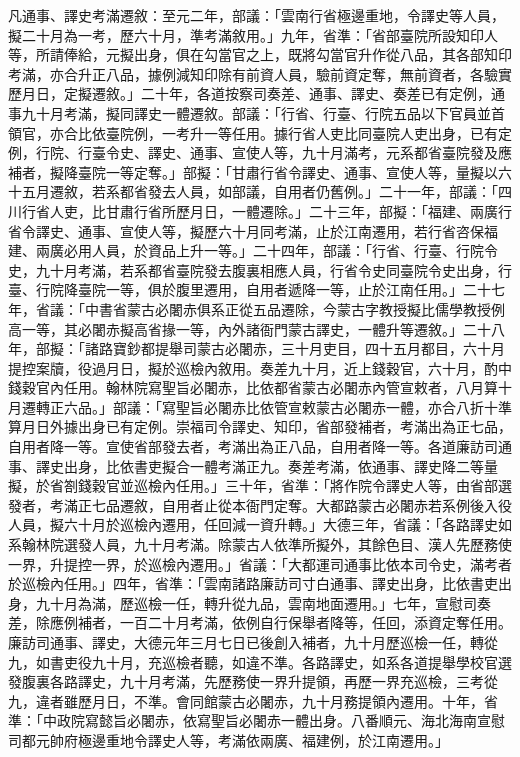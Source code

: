 \begin{pinyinscope}
 凡通事、譯史考滿遷敘：至元二年，部議：「雲南行省極邊重地，令譯史等人員，擬二十月為一考，歷六十月，準考滿敘用。」九年，省準：「省部臺院所設知印人等，所請俸給，元擬出身，俱在勾當官之上，既將勾當官升作從八品，其各部知印考滿，亦合升正八品，據例減知印除有前資人員，驗前資定奪，無前資者，各驗實歷月日，定擬遷敘。」二十年，各道按察司奏差、通事、譯史、奏差已有定例，通事九十月考滿，擬同譯史一體遷敘。部議：「行省、行臺、行院五品以下官員並首領官，亦合比依臺院例，一考升一等任用。據行省人吏比同臺院人吏出身，已有定例，行院、行臺令史、譯史、通事、宣使人等，九十月滿考，元系都省臺院發及應補者，擬降臺院一等定奪。」部擬：「甘肅行省令譯史、通事、宣使人等，量擬以六十五月遷敘，若系都省發去人員，如部議，自用者仍舊例。」二十一年，部議：「四川行省人吏，比甘肅行省所歷月日，一體遷除。」二十三年，部擬：「福建、兩廣行省令譯史、通事、宣使人等，擬歷六十月同考滿，止於江南遷用，若行省咨保福建、兩廣必用人員，於資品上升一等。」二十四年，部議：「行省、行臺、行院令史，九十月考滿，若系都省臺院發去腹裏相應人員，行省令史同臺院令史出身，行臺、行院降臺院一等，俱於腹里遷用，自用者遞降一等，止於江南任用。」二十七年，省議：「中書省蒙古必闍赤俱系正從五品遷除，今蒙古字教授擬比儒學教授例高一等，其必闍赤擬高省掾一等，內外諸衙門蒙古譯史，一體升等遷敘。」二十八年，部擬：「諸路寶鈔都提舉司蒙古必闍赤，三十月吏目，四十五月都目，六十月提控案牘，役過月日，擬於巡檢內敘用。奏差九十月，近上錢穀官，六十月，酌中錢穀官內任用。翰林院寫聖旨必闍赤，比依都省蒙古必闍赤內管宣敕者，八月算十月遷轉正六品。」部議：「寫聖旨必闍赤比依管宣敕蒙古必闍赤一體，亦合八折十準算月日外據出身已有定例。崇福司令譯史、知印，省部發補者，考滿出為正七品，自用者降一等。宣使省部發去者，考滿出為正八品，自用者降一等。各道廉訪司通事、譯史出身，比依書吏擬合一體考滿正九。奏差考滿，依通事、譯史降二等量擬，於省劄錢穀官並巡檢內任用。」三十年，省準：「將作院令譯史人等，由省部選發者，考滿正七品遷敘，自用者止從本衙門定奪。大都路蒙古必闍赤若系例後入役人員，擬六十月於巡檢內遷用，任回減一資升轉。」大德三年，省議：「各路譯史如系翰林院選發人員，九十月考滿。除蒙古人依準所擬外，其餘色目、漢人先歷務使一界，升提控一界，於巡檢內遷用。」省議：「大都運司通事比依本司令史，滿考者於巡檢內任用。」四年，省準：「雲南諸路廉訪司寸白通事、譯史出身，比依書吏出身，九十月為滿，歷巡檢一任，轉升從九品，雲南地面遷用。」七年，宣慰司奏差，除應例補者，一百二十月考滿，依例自行保舉者降等，任回，添資定奪任用。廉訪司通事、譯史，大德元年三月七日已後創入補者，九十月歷巡檢一任，轉從九，如書吏役九十月，充巡檢者聽，如違不準。各路譯史，如系各道提舉學校官選發腹裏各路譯史，九十月考滿，先歷務使一界升提領，再歷一界充巡檢，三考從九，違者雖歷月日，不準。會同館蒙古必闍赤，九十月務提領內遷用。十年，省準：「中政院寫懿旨必闍赤，依寫聖旨必闍赤一體出身。八番順元、海北海南宣慰司都元帥府極邊重地令譯史人等，考滿依兩廣、福建例，於江南遷用。」




\end{pinyinscope}
